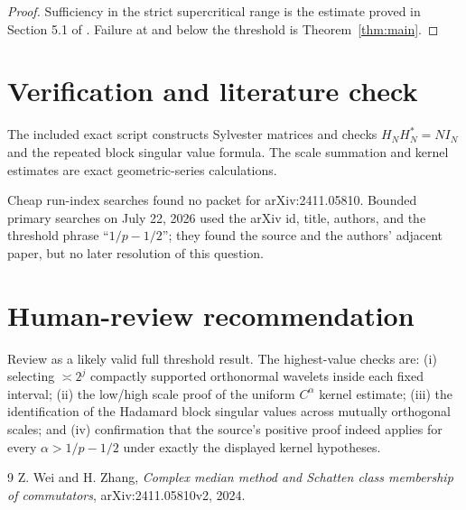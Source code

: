 \documentclass[11pt]{article}
\theoremstyle{remark}
\begin{document}
\begin{proof}
Sufficiency in the strict supercritical range is the estimate proved in
Section 5.1 of \cite{WZ}.  Failure at and below the threshold is
Theorem~\ref{thm:main}.
\end{proof}

\section{Verification and literature check}

The included exact script constructs Sylvester matrices and checks
$H_NH_N^*=NI_N$ and the repeated block singular value formula.  The scale
summation and kernel estimates are exact geometric-series calculations.

Cheap run-index searches found no packet for arXiv:2411.05810.  Bounded
primary searches on July 22, 2026 used the arXiv id, title, authors, and the
threshold phrase ``$1/p-1/2$''; they found the source and the authors'
adjacent paper, but no later resolution of this question.

\section{Human-review recommendation}

Review as a likely valid full threshold result.  The highest-value checks
are: (i) selecting $\asymp2^j$ compactly supported orthonormal wavelets
inside each fixed interval; (ii) the low/high scale proof of the uniform
$C^\alpha$ kernel estimate; (iii) the identification of the Hadamard block
singular values across mutually orthogonal scales; and (iv) confirmation
that the source's positive proof indeed applies for every
$\alpha>1/p-1/2$ under exactly the displayed kernel hypotheses.

\begin{thebibliography}{9}
Z. Wei and H. Zhang,
\emph{Complex median method and Schatten class membership of commutators},
arXiv:2411.05810v2, 2024.
\end{thebibliography}
\end{document}
